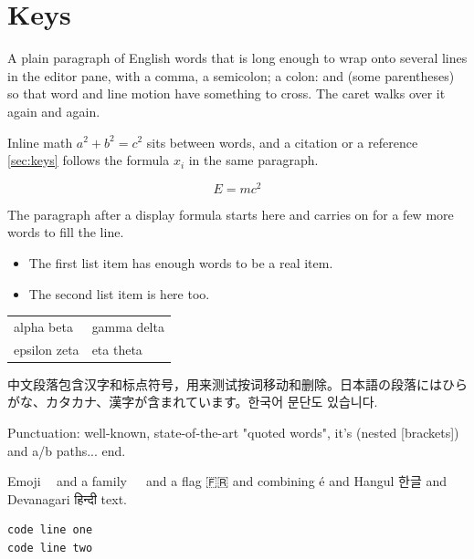 \documentclass{article}
\begin{document}
\section{Keys}

A plain paragraph of English words that is long enough to wrap onto several lines in the editor pane, with a comma, a semicolon; a colon: and (some parentheses) so that word and line motion have something to cross. The caret walks over it again and again.

Inline math $a^2+b^2=c^2$ sits between words, and a citation \cite{knuth} or a reference \ref{sec:keys} follows the formula $x_i$ in the same paragraph.

\begin{equation}
E = mc^2
\end{equation}

The paragraph after a display formula starts here and carries on for a few more words to fill the line.

\begin{itemize}
\item The first list item has enough words to be a real item.
\item The second list item is here too.
\end{itemize}

\begin{tabular}{ll}
alpha beta & gamma delta \\
epsilon zeta & eta theta \\
\end{tabular}

中文段落包含汉字和标点符号，用来测试按词移动和删除。日本語の段落にはひらがな、カタカナ、漢字が含まれています。한국어 문단도 있습니다.

Punctuation: well-known, state-of-the-art "quoted words", it's (nested [brackets]) and a/b paths... end.

Emoji 👍🏽 and a family 👨‍👩‍👧 and a flag 🇫🇷 and combining é and Hangul 한글 and Devanagari हिन्दी text.

\begin{verbatim}
code line one
code line two
\end{verbatim}
\end{document}
